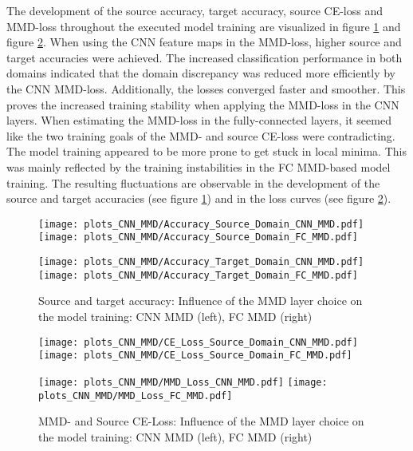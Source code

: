 The development of the source accuracy, target accuracy, source CE-loss and MMD-loss throughout the executed model training are visualized in figure \ref{fig:accuracy_cnn_and_no_cnn_mmd} and figure \ref{fig:loss_cnn_and_no_cnn_mmd}. When using the CNN feature maps in the MMD-loss, higher source and target accuracies were achieved. The increased classification performance in both domains indicated that the domain discrepancy was reduced more efficiently by the CNN MMD-loss. Additionally, the losses converged faster and smoother. This proves the increased training stability when applying the MMD-loss in the CNN layers. When estimating the MMD-loss in the fully-connected layers, it seemed like the two training goals of the MMD- and source CE-loss were contradicting. The model training appeared to be more prone to get stuck in local minima. This was mainly reflected by the training instabilities in the FC MMD-based model training. The resulting fluctuations are observable in the development of the source and target accuracies (see figure \ref{fig:accuracy_cnn_and_no_cnn_mmd}) and in the loss curves (see figure \ref{fig:loss_cnn_and_no_cnn_mmd}).

\begin{figure}[htp]
  \centering
  \texttt{[image: plots\_CNN\_MMD/Accuracy\_Source\_Domain\_CNN\_MMD.pdf]}
  \hspace{.3cm}
  \texttt{[image: plots\_CNN\_MMD/Accuracy\_Source\_Domain\_FC\_MMD.pdf]}

  \vspace{.1cm}

  \texttt{[image: plots\_CNN\_MMD/Accuracy\_Target\_Domain\_CNN\_MMD.pdf]}
  \hspace{.3cm}
  \texttt{[image: plots\_CNN\_MMD/Accuracy\_Target\_Domain\_FC\_MMD.pdf]}

  \caption{Source and target accuracy: Influence of the MMD layer choice on the model training: CNN MMD (left), FC MMD (right)}
  \label{fig:accuracy_cnn_and_no_cnn_mmd}
\end{figure}

\begin{figure}[H]
  \centering
  \texttt{[image: plots\_CNN\_MMD/CE\_Loss\_Source\_Domain\_CNN\_MMD.pdf]}
  \hspace{.3cm}
  \texttt{[image: plots\_CNN\_MMD/CE\_Loss\_Source\_Domain\_FC\_MMD.pdf]}

  \vspace{.1cm}

  \texttt{[image: plots\_CNN\_MMD/MMD\_Loss\_CNN\_MMD.pdf]}
  \hspace{.1cm}
  \texttt{[image: plots\_CNN\_MMD/MMD\_Loss\_FC\_MMD.pdf]}

  \caption{MMD- and Source CE-Loss: Influence of the MMD layer choice on the model training: CNN MMD (left), FC MMD (right)}
  \label{fig:loss_cnn_and_no_cnn_mmd}
\end{figure}

